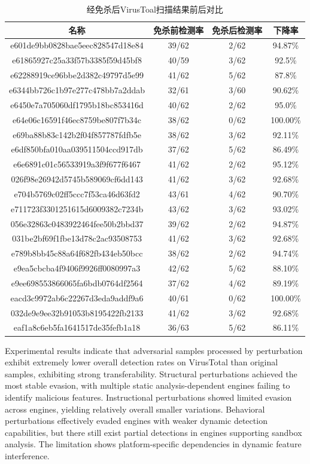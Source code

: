 \begin{table}[htbp]
	\centering
	\caption{经免杀后VirusToal扫描结果前后对比}
	\label{tab:5.13}
	\begin{tabular*}{0.9\textwidth}{@{\extracolsep{\fill}}cccc}
		\toprule
		名称 & 免杀前检测率 & 免杀后检测率 & 下降率 \\
		\midrule
		e601de9bb0828bae5eec828547d18e84 & 39/62 & 2/62 & 94.87\% \\
		e61865927c25a33f57b3385f59d45bf8 & 40/59 & 3/62 & 92.5\% \\
		e62288919ce96bbe2d382c49797d5e99 & 41/62 & 5/62 & 87.8\% \\
		e6344bb726c1b97e277c478bb7a2ddab & 32/61 & 3/60 & 90.62\% \\
		e6450e7a705060df1795b18bc853416d & 40/62 & 2/62 & 95.0\% \\
		e64e06c16591f46ec8759be807f7b34c & 38/62 & 0/62 & 100.00\% \\
		e69ba88b83c142b2f04f857787fdfb5e & 38/62 & 3/62 & 92.11\% \\
		e6df850bfa010aa039511504ccd917db & 37/62 & 5/62 & 86.49\% \\
		e6e6891c01c56533919a3f9f677f6467 & 41/62 & 2/62 & 95.12\% \\
		026f98e26942d5745b589069cf6dd143 & 41/62 & 3/62 & 92.68\% \\
		e704b5769c02ff5ccc7f53ca46d63fd2 & 43/61 & 4/62 & 90.70\% \\
		e711723f3301251615d6009382c7234b & 43/62 & 3/62 & 93.02\% \\
		056e32863c0483922464fee50b2bbd37 & 39/62 & 2/62 & 94.87\% \\
		031be2bf69f1fbe13d78c2ac93508753 & 41/62 & 3/62 & 92.68\% \\
		e789b8bb45c88a64f682fb434eb50bcc & 38/62 & 2/62 & 94.74\% \\
		e9ea5cbcba4f9406f9926ff0080997a3 & 42/62 & 5/62 & 88.10\% \\
		e9ee698553866065fa6bdb0764df2564 & 37/62 & 4/62 & 89.19\% \\
		eacd3c9972ab6c22267d3eda9addf9a6 & 40/61 & 0/62 & 100.00\% \\
		032de9e9ee32b91053b8195422fb2133 & 41/62 & 3/62 & 92.68\% \\
		eaf1a8c6eb5fa1641517de35fefb1a18 & 36/63 & 5/62 & 86.11\% \\
		\bottomrule
	\end{tabular*}
\end{table}

Experimental results indicate that adversarial samples processed by perturbation exhibit extremely lower overall detection rates on VirusTotal than original samples, exhibiting strong transferability. Structural perturbations achieved the most stable evasion, with multiple static analysis-dependent engines failing to identify malicious features. Instructional perturbations showed limited evasion across engines, yielding relatively overall smaller variations. Behavioral perturbations effectively evaded engines with weaker dynamic detection capabilities, but there still exist partial detections in engines supporting sandbox analysis. The limitation shows platform-specific dependencies in dynamic feature interference.

